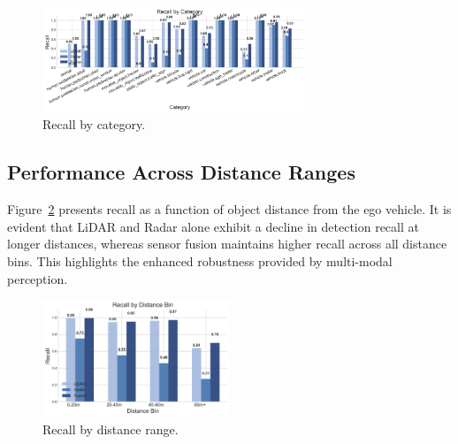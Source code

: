 \documentclass[10pt, a4paper, oneside]{article}
\begin{document}
\begin{figure}[H]
    \centering
    \includegraphics[width=0.7\textwidth]{../output/plots/recall_by_category.png}
    \caption{Recall by category.}
    \label{fig:recall_by_category}
\end{figure}

\begin{small}
\end{small}


\subsection{Performance Across Distance Ranges}
Figure~\ref{fig:recall_by_distance} presents recall as a function of object distance from the ego vehicle. It is evident that LiDAR and Radar alone exhibit a decline in detection recall at longer distances, whereas sensor fusion maintains higher recall across all distance bins. This highlights the enhanced robustness provided by multi-modal perception.

\begin{figure}[H]
    \centering
    \includegraphics[width=0.5\textwidth]{../output/plots/recall_by_distance.png}
    \caption{Recall by distance range.}
    \label{fig:recall_by_distance}
\end{figure}

\begin{small}
\end{small}
\end{document}
